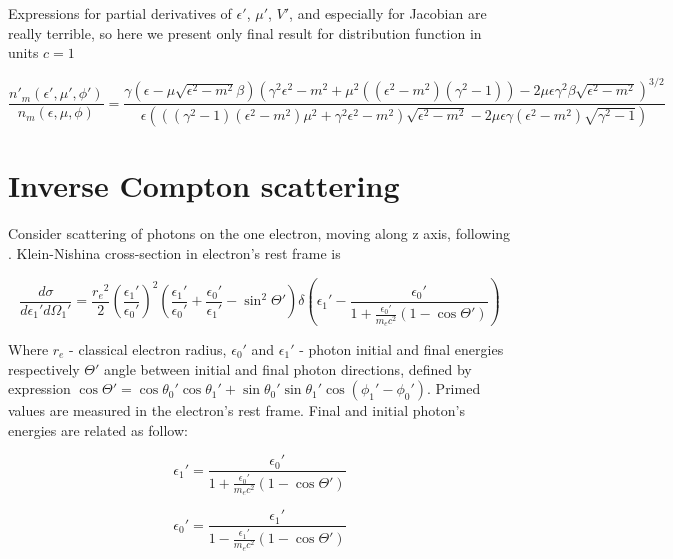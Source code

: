 Expressions for partial derivatives of $\epsilon'$, $\mu'$, $V'$, and especially for Jacobian are really terrible, so here we present only final result for distribution function in units $c = 1$

\begin{equation}
		\frac{n'_{m}(\epsilon',\mu',\phi')}{n_{m}(\epsilon,\mu,\phi)}= \frac{\gamma(\epsilon-\mu\sqrt{{\epsilon}^2-m^2}\beta)(\gamma^2\epsilon^2-m^2 + \mu^2 ((\epsilon^2-m^2)(\gamma^2-1)) - 2\mu\epsilon\gamma^2\beta\sqrt{\epsilon^2-m^2})^{3/2}}{\epsilon(((\gamma^2-1)(\epsilon^2-m^2)\mu^2 + \gamma^2\epsilon^2 - m^2)\sqrt{\epsilon^2-m^2}-2\mu\epsilon\gamma(\epsilon^2 - m^2)\sqrt{\gamma^2 - 1})}
\end{equation}

\section{Inverse Compton scattering}\label{ComptonFormulaeSection}

Consider scattering of photons on the one electron, moving along z axis, following \cite{Dubus}. Klein-Nishina cross-section in electron's rest frame is

\begin{equation}\label{KleinNishina}
	\frac{d\sigma}{d\epsilon_1'd\Omega_1'}=\frac{{r_e}^2}{2}\left(\frac{\epsilon_1'}{\epsilon_0'}\right)^2\left(\frac{\epsilon_1'}{\epsilon_0'}+\frac{\epsilon_0'}{\epsilon_1'}-\sin^2\Theta'\right) \delta\left(\epsilon_1' - \frac{\epsilon_0'}{1+\frac{\epsilon_0'}{m_e c^2}(1 - \cos \Theta')}\right)
\end{equation}

Where $r_e$ - classical electron radius, $\epsilon_0'$ and $\epsilon_1'$ - photon initial and final energies respectively $\Theta'$ angle between initial and final photon directions, defined by expression $\cos\Theta' =\cos \theta_0' \cos \theta_1' + \sin \theta_0' \sin \theta_1' \cos(\phi_1' - \phi_0')$. Primed values are measured in the electron's rest frame. Final and initial photon's energies are related as follow:

\begin{equation}
	\epsilon_1'=\frac{\epsilon_0'}{1+\frac{\epsilon_0'}{m_e c^2}(1 - \cos \Theta')}	
\end{equation}

\begin{equation}
	\epsilon_0'=\frac{\epsilon_1'}{1-\frac{\epsilon_1'}{m_e c^2}(1 - \cos \Theta')}
\end{equation}

